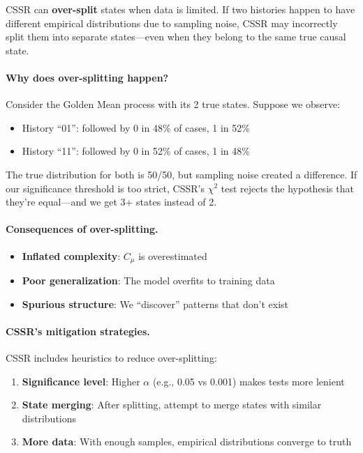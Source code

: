 \documentclass[11pt,a4paper]{article}
\theoremstyle{definition}
\theoremstyle{plain}
\newcommand{\Cmu}{C_\mu}
\begin{document}
\begin{warning}[title=CSSR's Achilles Heel]
CSSR can \textbf{over-split} states when data is limited. If two histories happen to have different empirical distributions due to sampling noise, CSSR may incorrectly split them into separate states---even when they belong to the same true causal state.
\end{warning}

\paragraph{Why does over-splitting happen?}
Consider the Golden Mean process with its 2 true states. Suppose we observe:
\begin{itemize}[nosep]
    \item History ``01'': followed by 0 in 48\% of cases, 1 in 52\%
    \item History ``11'': followed by 0 in 52\% of cases, 1 in 48\%
\end{itemize}

The true distribution for both is 50/50, but sampling noise created a difference. If our significance threshold is too strict, CSSR's $\chi^2$ test rejects the hypothesis that they're equal---and we get 3+ states instead of 2.

\paragraph{Consequences of over-splitting.}
\begin{itemize}[nosep]
    \item \textbf{Inflated complexity}: $\Cmu$ is overestimated
    \item \textbf{Poor generalization}: The model overfits to training data
    \item \textbf{Spurious structure}: We ``discover'' patterns that don't exist
\end{itemize}

\paragraph{CSSR's mitigation strategies.}
CSSR includes heuristics to reduce over-splitting:
\begin{enumerate}[nosep]
    \item \textbf{Significance level}: Higher $\alpha$ (e.g., 0.05 vs 0.001) makes tests more lenient
    \item \textbf{State merging}: After splitting, attempt to merge states with similar distributions
    \item \textbf{More data}: With enough samples, empirical distributions converge to truth
\end{enumerate}
\end{document}
